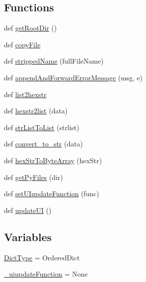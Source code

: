 \subsection*{Functions}
\begin{DoxyCompactItemize}
\item 
def \hyperlink{namespacesoftware_1_1chipwhisperer_1_1common_1_1utils_1_1util_a11b5d0b7d7861308fcf300efc50a6a68}{get\+Root\+Dir} ()
\item 
def \hyperlink{namespacesoftware_1_1chipwhisperer_1_1common_1_1utils_1_1util_aae19dbfe7566c2ae892a616cea701954}{copy\+File}
\item 
def \hyperlink{namespacesoftware_1_1chipwhisperer_1_1common_1_1utils_1_1util_aab8bbeaa86a40daf0f2d054089e79696}{stripped\+Name} (full\+File\+Name)
\item 
def \hyperlink{namespacesoftware_1_1chipwhisperer_1_1common_1_1utils_1_1util_ae908bc5f3ca084c9501cec78422f1fb7}{append\+And\+Forward\+Error\+Message} (msg, e)
\item 
def \hyperlink{namespacesoftware_1_1chipwhisperer_1_1common_1_1utils_1_1util_ab9523216670c8ca6ee80632fd361e3d7}{list2hexstr}
\item 
def \hyperlink{namespacesoftware_1_1chipwhisperer_1_1common_1_1utils_1_1util_ad2cd7abc81938c0de013778a8044d187}{hexstr2list} (data)
\item 
def \hyperlink{namespacesoftware_1_1chipwhisperer_1_1common_1_1utils_1_1util_a6f71ffb5d9ae253734e37a687d49d132}{str\+List\+To\+List} (strlist)
\item 
def \hyperlink{namespacesoftware_1_1chipwhisperer_1_1common_1_1utils_1_1util_a11d75631a72f9c0c702542db1e3591d5}{convert\+\_\+to\+\_\+str} (data)
\item 
def \hyperlink{namespacesoftware_1_1chipwhisperer_1_1common_1_1utils_1_1util_a1d3b1731a3bdb29f7a0b429095243bb3}{hex\+Str\+To\+Byte\+Array} (hex\+Str)
\item 
def \hyperlink{namespacesoftware_1_1chipwhisperer_1_1common_1_1utils_1_1util_af9db4a9b0df70649f5afcf541196edba}{get\+Py\+Files} (dir)
\item 
def \hyperlink{namespacesoftware_1_1chipwhisperer_1_1common_1_1utils_1_1util_a122bb717e53cd2ccfa7274a307679202}{set\+U\+Iupdate\+Function} (func)
\item 
def \hyperlink{namespacesoftware_1_1chipwhisperer_1_1common_1_1utils_1_1util_a2e4fb0757363e9387a6072084d7341a3}{update\+U\+I} ()
\end{DoxyCompactItemize}
\subsection*{Variables}
\begin{DoxyCompactItemize}
\item 
\hyperlink{namespacesoftware_1_1chipwhisperer_1_1common_1_1utils_1_1util_aa256ae974052a2cfddc80fd21216b08d}{Dict\+Type} = Ordered\+Dict
\item 
\hyperlink{namespacesoftware_1_1chipwhisperer_1_1common_1_1utils_1_1util_adc2daa599b24498a339b01ed819bca3d}{\+\_\+uiupdate\+Function} = None
\end{DoxyCompactItemize}



